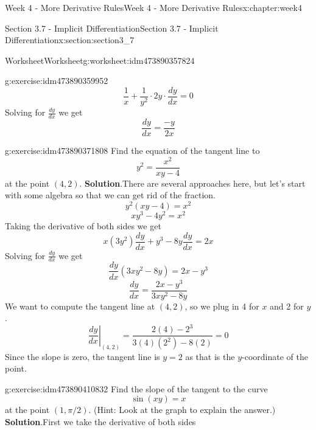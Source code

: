 \documentclass[oneside,10pt,]{book}
\newcommand{\blocktitlefont}{\relax}
\numberwithin{equation}{section}
\begin{document}
\begin{chapterptx}{Week 4 - More Derivative Rules}{}{Week 4 - More Derivative Rules}{}{}{x:chapter:week4}
\begin{sectionptx}{Section 3.7 - Implicit Differentiation}{}{Section 3.7 - Implicit Differentiation}{}{}{x:section:section3_7}
\begin{worksheet-subsection}{Worksheet}{}{Worksheet}{}{}{g:worksheet:idm473890357824}
\begin{divisionexercise}{1}{}{}{g:exercise:idm473890359952}
\begin{equation*}
\frac 1x + \frac{1}{y^2}\cdot 2y \cdot \frac{dy}{dx} = 0 
\end{equation*}
Solving for \(\frac{dy}{dx}\) we get%
\begin{equation*}
\frac{dy}{dx} = \frac{-y}{2x} 
\end{equation*}
%
\end{divisionexercise}%
\begin{divisionexercise}{2}{}{}{g:exercise:idm473890371808}%
Find the equation of the tangent line to%
\begin{equation*}
y^2 = \frac{x^2}{xy-4} 
\end{equation*}
at the point \((4,2)\).%
\textbf{\blocktitlefont Solution}.\hypertarget{g:solution:idm473890380176}{}\quad{}There are several approaches here, but let's start with some algebra so that we can get rid of the fraction.%
\begin{equation*}
y^2(xy-4) = x^2 
\end{equation*}
%
\begin{equation*}
xy^3-4y^2 = x^2 
\end{equation*}
Taking the derivative of both sides we get%
\begin{equation*}
x(3y^2)\frac{dy}{dx} + y^3 - 8y\frac{dy}{dx} = 2x 
\end{equation*}
Solving for \(\frac{dy}{dx}\) we get%
\begin{equation*}
\frac{dy}{dx}(3xy^2-8y) = 2x-y^3 
\end{equation*}
%
\begin{equation*}
\frac{dy}{dx} = \frac{2x-y^3}{3xy^2-8y} 
\end{equation*}
We want to compute the tangent line at \((4,2)\), so we plug in 4 for \(x\) and 2 for \(y\).%
\begin{equation*}
\left. \frac{dy}{dx} \right\vert_{(4,2)} = \frac{2(4)-2^3}{3(4)(2^2)-8(2)} = 0 
\end{equation*}
Since the slope is zero, the tangent line is \(y=2\) as that is the \(y\)-coordinate of the point.%
\end{divisionexercise}%
\begin{divisionexercise}{3}{}{}{g:exercise:idm473890410832}%
Find the slope of the tangent to the curve%
\begin{equation*}
\sin (xy) = x 
\end{equation*}
at the point \((1, \pi/2)\). (Hint: Look at the graph to explain the answer.)%
\textbf{\blocktitlefont Solution}.\hypertarget{g:solution:idm473890417552}{}\quad{}First we take the derivative of both sides%

\end{divisionexercise}
\end{worksheet-subsection}
\end{sectionptx}
\end{chapterptx}
\end{document}
